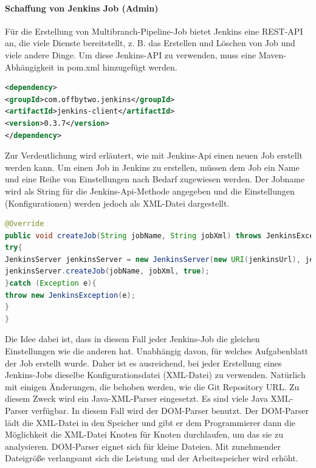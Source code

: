 \documentclass[apaper4,12p]{scrartcl}
\begin{document}
\paragraph{Schaffung von Jenkins Job (Admin)}
Für die Erstellung von Multibranch-Pipeline-Job bietet Jenkins eine REST-API an, die viele Dienste bereitstellt, z. B. das Erstellen und Löschen von Job und viele andere Dinge. Um diese Jenkins-API zu verwenden, muss eine Maven-Abhängigkeit in pom.xml hinzugefügt werden.
\begin{lstlisting}[language=XML,caption=pom.xml - Jenkins-Api]
<dependency>
<groupId>com.offbytwo.jenkins</groupId>
<artifactId>jenkins-client</artifactId>
<version>0.3.7</version>
</dependency>
\end{lstlisting}
Zur Verdeutlichung wird erläutert, wie mit Jenkins-Api einen neuen Job erstellt werden kann. Um einen Job in Jenkins zu erstellen, müssen dem Job  ein Name und eine Reihe von Einstellungen nach Bedarf  zugewiesen werden.
\newline
Der Jobname wird als String  für die Jenkins-Api-Methode angegeben und die Einstellungen (Konfigurationen) werden jedoch als XML-Datei dargestellt.
\begin{lstlisting}[language=JAVA,caption=JenkinsServiceImp - createJob]
@Override
public void createJob(String jobName, String jobXml) throws JenkinsException {
try{
JenkinsServer jenkinsServer = new JenkinsServer(new URI(jenkinsUrl), jenkinsUser, jenkinsPassword);
jenkinsServer.createJob(jobName, jobXml, true);
}catch (Exception e){
throw new JenkinsException(e);
} 
}
\end{lstlisting}
Die Idee dabei ist, dass in diesem Fall jeder Jenkins-Job die gleichen Einstellungen wie die anderen hat. Unabhängig davon, für welches Aufgabenblatt der Job erstellt wurde. Daher ist es ausreichend, bei jeder Erstellung eines Jenkins-Jobs dieselbe Konfigurationsdatei (XML-Datei) zu verwenden. Natürlich mit einigen Änderungen, die behoben werden, wie die Git Repository URL. Zu diesem Zweck wird ein Java-XML-Parser eingesetzt. Es sind viele Java XML-Parser verfügbar. In diesem Fall wird der DOM-Parser benutzt. Der DOM-Parser lädt die XML-Datei in den Speicher und gibt er dem Programmierer dann die Möglichkeit die XML-Datei Knoten für Knoten durchlaufen, um das sie zu analysieren. DOM-Parser eignet sich für kleine Dateien. Mit zunehmender Dateigröße verlangsamt sich die Leistung und der Arbeitsspeicher wird erhöht.
\end{document}
